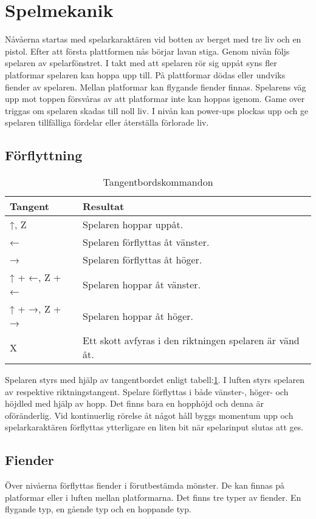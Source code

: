 \documentclass{TDP005mall}
\begin{document}
\section{Spelmekanik}%
Nåvåerna startas med spelarkaraktären vid botten av berget med tre liv och en pistol. Efter att första plattformen nås börjar lavan stiga. Genom nivån följs spelaren av spelarfönstret. I takt med att spelaren rör sig uppåt syns fler platformar spelaren kan hoppa upp till. På plattformar dödas eller undviks fiender av spelaren. Mellan platformar kan flygande fiender finnas. Spelarens väg upp mot toppen försvåras av att platformar inte kan hoppas igenom. Game over triggas om spelaren skadas till noll liv. I nivån kan power-ups plockas upp och ge spelaren tillfälliga fördelar eller återställa förlorade liv. 

\subsection{Förflyttning}

\begin{table}[h!]
  \centering
  \caption{Tangentbordskommandon\label{tab:1}}
\begin{tabular}{|l|l|}
\hline
Tangent & Resultat \\\hline
↑, Z & Spelaren hoppar uppåt. \\\hline
← & Spelaren förflyttas åt vänster. \\\hline
→ & Spelaren förflyttas åt höger. \\\hline
↑ + ←, Z + ← & Spelaren hoppar åt vänster. \\\hline
↑ + →, Z + → & Spelaren hoppar åt höger. \\\hline
X & Ett skott avfyras i den riktningen spelaren är vänd åt. \\\hline
\end{tabular}
\end{table}


Spelaren styrs med hjälp av tangentbordet enligt tabell:\ref{tab:1}. I luften styrs spelaren av respektive riktningstangent. Spelare förflyttas i både vänster-, höger- och höjdled med hjälp av hopp. Det finns bara en hopphöjd och denna är oföränderlig. Vid kontinuerlig rörelse åt något håll byggs momentum upp och spelarkaraktären förflyttas ytterligare en liten bit när spelarinput slutas att ges.

\subsection{Fiender}
Över nivåerna förflyttas fiender i förutbestämda mönster. De kan finnas på platformar eller i luften mellan platformarna. Det finns tre typer av fiender. En flygande typ, en gående typ och en hoppande typ.
\end{document}
